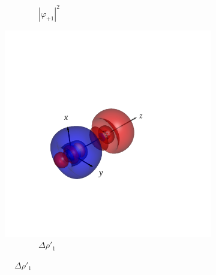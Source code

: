 \documentclass[journal=inoraj,manuscript=article]{achemso}
\begin{document}
\begin{figure}[!h]
\begin{subfigure}[t]{0.30\textwidth}
        \caption*{\ \ \ \ \ \ \ \ $|\varphi_{+1}|^2$} 
    \end{subfigure}
    \hfill
    \begin{subfigure}[t]{0.30\textwidth}
        \centering
        \includegraphics[width=\linewidth]{./AuHg+/pair1.png} 
        \caption*{\ \ \ \ \ \ \ \ $\Delta \rho'_1$} 
    \end{subfigure}


\end{figure}
\end{document}
